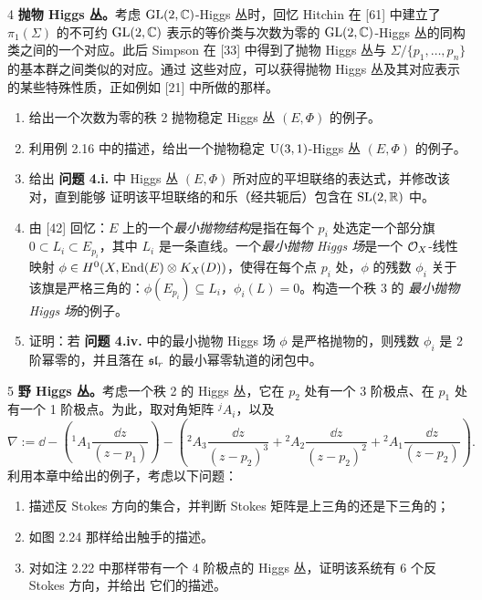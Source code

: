 \begin{prob}{4}
\textbf{抛物 Higgs 丛。}考虑 $\mathrm{GL}(2,\mathbb{C})$-Higgs 丛时，回忆 Hitchin 在 [61] 中建立了 $\pi_1(\Sigma)$
的不可约 $\mathrm{GL}(2,\mathbb{C})$ 表示的等价类与次数为零的 $\mathrm{GL}(2,\mathbb{C})$-Higgs 丛的同构类之间的一个对应。此后
Simpson 在 [33] 中得到了抛物 Higgs 丛与 $\Sigma/\{p_1,\dots,p_n\}$ 的基本群之间类似的对应。通过
这些对应，可以获得抛物 Higgs 丛及其对应表示的某些特殊性质，正如例如 [21] 中所做的那样。
\begin{enumerate}[label=(\roman*),leftmargin=2.2em]
\item 给出一个次数为零的秩 2 抛物稳定 Higgs 丛 $(E,\Phi)$ 的例子。
\item 利用例 2.16 中的描述，给出一个抛物稳定 $\mathrm{U}(3,1)$-Higgs 丛 $(E,\Phi)$ 的例子。
\item 给出 \textbf{问题 4.i.} 中 Higgs 丛 $(E,\Phi)$ 所对应的平坦联络的表达式，并修改该对，直到能够
  证明该平坦联络的和乐（经共轭后）包含在 $\mathrm{SL}(2,\mathbb{R})$ 中。
\item 由 [42] 回忆：$E$ 上的一个\emph{最小抛物结构}是指在每个 $p_i$ 处选定一个部分旗
  $0\subset L_i\subset E_{p_i}$，其中 $L_i$ 是一条直线。一个\emph{最小抛物 Higgs 场}是一个
  $\mathcal{O}_X$-线性映射 $\phi\in H^0(X,\operatorname{End}(E)\otimes K_X(D))$，使得在每个点 $p_i$ 处，$\phi$ 的残数
  $\phi_i$ 关于该旗是严格三角的：$\phi(E_{p_i})\subseteq L_i$，$\phi_i(L)=0$。构造一个秩 3 的
  \emph{最小抛物 Higgs 场}的例子。
\item 证明：若 \textbf{问题 4.iv.} 中的最小抛物 Higgs 场 $\phi$ 是严格抛物的，则残数 $\phi_i$
  是 2 阶幂零的，并且落在 $\mathfrak{sl}_r$ 的最小幂零轨道的闭包中。
\end{enumerate}
\end{prob}

\begin{prob}{5}
\textbf{野 Higgs 丛。}考虑一个秩 2 的 Higgs 丛，它在 $p_2$ 处有一个 3 阶极点、在 $p_1$ 处有一个
1 阶极点。为此，取对角矩阵 ${}^{j}A_i$，以及
\[
\nabla := \dd - \left({}^{1}A_1\frac{\dd z}{(z-p_1)}\right)
 - \left({}^{2}A_3\frac{\dd z}{(z-p_2)^3} + {}^{2}A_2\frac{\dd z}{(z-p_2)^2}
 + {}^{2}A_1\frac{\dd z}{(z-p_2)}\right).
\]
利用本章中给出的例子，考虑以下问题：
\begin{enumerate}[label=(\roman*),leftmargin=2.2em]
\item 描述反 Stokes 方向的集合，并判断 Stokes 矩阵是上三角的还是下三角的；
\item 如图 2.24 那样给出触手的描述。
\item 对如注 2.22 中那样带有一个 4 阶极点的 Higgs 丛，证明该系统有 6 个反 Stokes 方向，并给出
  它们的描述。
\end{enumerate}
\end{prob}

